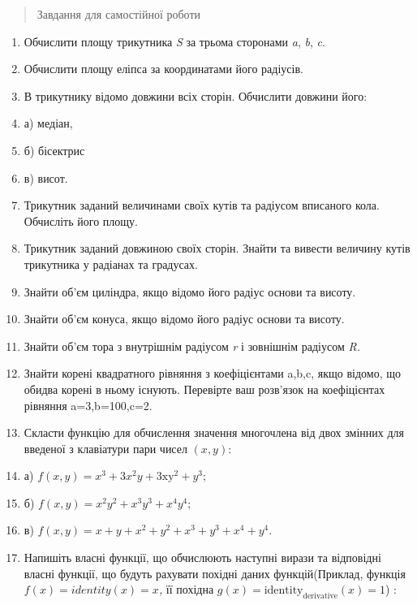 \documentclass[]{article}
\begin{document}
\begin{quote}
Завдання для самостійної роботи
\end{quote}

\begin{enumerate}
\def\labelenumi{\arabic{enumi})}
\item
  Обчислити площу трикутника \emph{S} за трьома сторонами \emph{a},
  \emph{b}, \emph{c}.
\item
  Обчислити площу еліпса за координатами його радіусів.
\item
  В трикутнику відомо довжини всіх сторін. Обчислити довжини його:
\item
  а) медіан,
\item
  б) бісектрис
\item
  в) висот.
\item
  Трикутник заданий величинами своїх кутів та радіусом вписаного кола.
  Обчисліть його площу.
\item
  Трикутник заданий довжиною своїх сторін. Знайти та вивести величину
  кутів трикутника у радіанах та градусах.
\item
  Знайти об'єм циліндра, якщо відомо його радіус основи та висоту.
\item
  Знайти об'єм конуса, якщо відомо його радіус основи та висоту.
\item
  Знайти об'єм тора з внутрішнім радіусом \emph{r} і зовнішнім радіусом
  \emph{R.}
\item
  Знайти корені квадратного рівняння з коефіцієнтами a,b,c, якщо відомо,
  що обидва корені в ньому існують. Перевірте ваш розв'язок на
  коефіцієнтах рівняння a=3,b=100,c=2.
\item
  Скласти функцію для обчислення значення многочлена від двох змінних
  для введеної з клавіатури пари чисел \((x,y)\):
\item
  а) \(f(x,y) = x^{3} + 3x^{2}y + 3\mathrm{\text{xy}}^{2} + y^{3};\)
\item
  б) \(f(x,y) = x^{2}y^{2} + x^{3}y^{3} + x^{4}y^{4};\)
\item
  в)
  \(f(x,y) = x + y + x^{2} + y^{2} + x^{3} + y^{3} + x^{4} + y^{4}\mathrm{.}\)
\item
  Напишіть власні функції, що обчислюють наступні вирази та відповідні
  власні функції, що будуть рахувати похідні даних функцій(Приклад,
  функція \(f(x) = identity(x) = x\)\emph{,} її похідна
  \(g(x) = \text{identity}_{\text{derivative}}(x) = 1\)) :
\end{enumerate}
\end{document}
